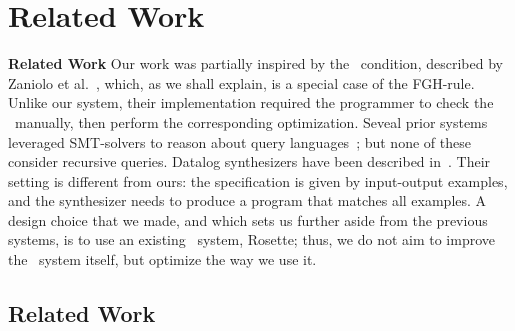 \chapter{Related Work}
\label{chap:related}

\textbf{Related Work} Our work was partially inspired by the \prem\
condition, described by Zaniolo et
al.~\cite{DBLP:journals/tplp/ZanioloYDSCI17}, which, as we shall
explain, is a special case of the FGH-rule.  Unlike our system, their
implementation required the programmer to check the \prem\ manually,
then perform the corresponding optimization.
%
Seveal prior systems  leveraged SMT-solvers to reason about
query languages~\cite{
  DBLP:conf/icfem/VeanesGHT09,
  DBLP:conf/cidr/ChuWWC17,
  DBLP:conf/cav/GrossmanCIRS17,
  DBLP:conf/sosp/SchlaipferRLS17,
  DBLP:journals/pacmpl/0001DLC18};
but none of these  consider recursive queries.
%
Datalog synthesizers have been described in~\cite{
  DBLP:conf/cp/AlbarghouthiKNS17,
  DBLP:conf/sigsoft/SiLZAKN18,
  DBLP:conf/ijcai/SiRHN19,
  DBLP:journals/pvldb/WangSCPD20,
  DBLP:journals/pacmpl/RaghothamanMZNS20}.
Their setting is different from ours:
the specification is given by input-output examples, and the
synthesizer needs to produce a program that matches all examples.
A design choice that we made, and which sets us further aside from the
previous systems, is to use an existing \cegis\ system, Rosette; thus,
we do not aim to  improve the \cegis\ system itself, but optimize the
way we use it.


\section{Related Work}

